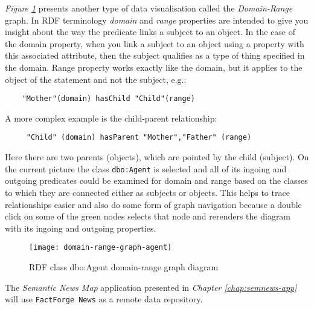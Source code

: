 \textit{Figure \ref{fig:domain-range-graph-agent}} presents another type of data visualisation called the \textit{Domain-Range} graph. In RDF terminology \textit{domain} and \textit{range} properties are intended to give you insight about the way the predicate links a subject to an object. In the case of the domain property, when you link a subject to an object using a property with this associated attribute, then the subject qualifies as a type of thing specified in the domain. Range property works exactly like the domain, but it applies to the object of the statement and not the subject, e.g.:
\begin{verbatim}
    "Mother"(domain) hasChild "Child"(range)
\end{verbatim}
A more complex example is the child-parent relationship:
 \begin{verbatim}
     "Child" (domain) hasParent "Mother","Father" (range)
 \end{verbatim}
Here there are two parents (objects), which are pointed by the child (subject). On the current picture the class \texttt{dbo:Agent} is selected and all of its ingoing and outgoing predicates could be examined for domain and range based on the classes to which they are connected either as subjects or objects. This helps to trace relationships easier and also do some form of graph navigation because a double click on some of the green nodes selects that node and rerenders the diagram with its ingoing and outgoing properties.
\begin{figure}[h!]
    \centering
    \texttt{[image: domain-range-graph-agent]}
    \caption{RDF class dbo:Agent domain-range graph diagram}
    \label{fig:domain-range-graph-agent}
\end{figure}

The \textit{Semantic News Map} application presented in \textit{Chapter \ref{chap:semnews-app}} will use \texttt{FactForge News} as a remote data repository. 

